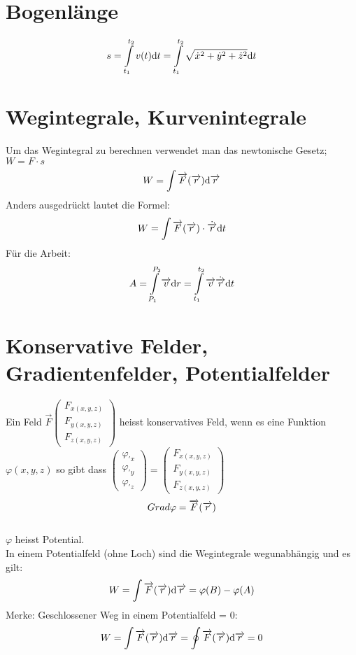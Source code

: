 \section{Bogenlänge}
\[
	s= \int\limits_{t_1}^{t_2} v(t)\mathrm{d} t= \int\limits_{t_1}^{t_2} \sqrt{\dot{x}^2+\dot{y}^2+\dot{z}^2}\mathrm{d} t
\]


\section{Wegintegrale, Kurvenintegrale}
Um das Wegintegral zu berechnen verwendet man das newtonische Gesetz; $W=F\cdot s$
\[
	W=\int \overrightarrow{F}(\overrightarrow{r}) \mathrm{d} \overrightarrow{r}
\]
Anders ausgedrückt lautet die Formel:
\[
	W=\int \overrightarrow{F}(\overrightarrow{r})\cdot \dot{\overrightarrow{r}} \mathrm{d} t
\]
Für die Arbeit: 
\[
	A= \int\limits_{P_1}^{P_2}\overrightarrow{v}\mathrm{d} r= \int\limits_{t_1}^{t_2} \overrightarrow{v}\dot{\overrightarrow{r}}\mathrm{d} t
\]
\section{Konservative Felder, Gradientenfelder, Potentialfelder}
Ein Feld 
 $\overrightarrow{F}
\begin{pmatrix}
 	F_{x(x,y,z)}\\
	F_{y(x,y,z)}\\
	F_{z(x,y,z)}
\end{pmatrix}$ heisst konservatives Feld, wenn es eine Funktion $\varphi(x,y,z)$ so gibt dass
$	\begin{pmatrix}
	 	\varphi_{'x}\\
		\varphi_{'y}\\
		\varphi_{'z}
	\end{pmatrix} 
	=																\begin{pmatrix}
		F_{x(x,y,z)}\\											F_{y(x,y,z)}\\
		F_{z(x,y,z)}								
	\end{pmatrix} 
$	\\
\[
	\\ Grad \varphi = \overrightarrow{F}(\overrightarrow{r})
\]
\\
$\varphi$ heisst Potential.\\
In einem Potentialfeld (ohne Loch) sind die Wegintegrale wegunabhängig und es gilt:
\[
	W=\int \overrightarrow{F}(\overrightarrow{r}) \mathrm{d} \overrightarrow{r}= \varphi(B)-\varphi(A)
\]
Merke: Geschlossener Weg in einem Potentialfeld = 0:
\[
	W=\int \overrightarrow{F}(\overrightarrow{r}) \mathrm{d} \overrightarrow{r}= \oint  \overrightarrow{F}(\overrightarrow{r}) \mathrm{d} \overrightarrow{r}=0
\]
\\
